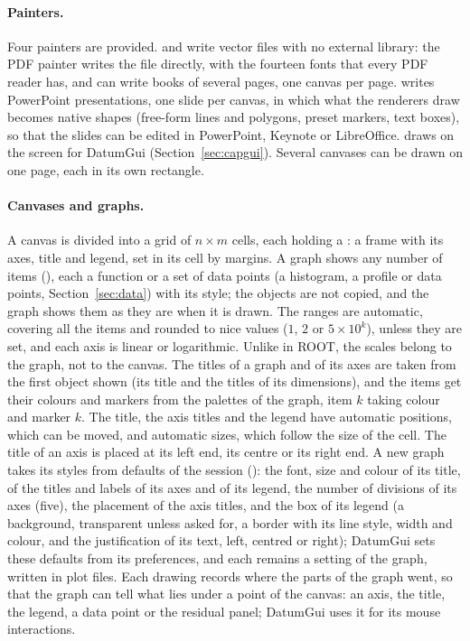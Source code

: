\paragraph{Painters.}
Four painters are provided.  and  write vector files with no external library: the
PDF painter writes the file directly, with the fourteen fonts that every PDF reader has, and can write books of
several pages, one canvas per page.  writes PowerPoint presentations, one slide per canvas, in which
what the renderers draw becomes native shapes (free-form lines and polygons, preset markers, text boxes), so that the
slides can be edited in PowerPoint, Keynote or LibreOffice.  draws on the screen for DatumGui
(Section~\ref{sec:capgui}). Several canvases can be drawn on one page, each in its own rectangle.

\paragraph{Canvases and graphs.}
A canvas is divided into a grid of $n \times m$ cells, each holding a : a frame with its axes, title and
legend, set in its cell by margins. A graph shows any number of items (), each a function or a set of
data points (a histogram, a profile or data points, Section~\ref{sec:data}) with its style; the objects are not
copied, and the graph shows them as they are when it is drawn. The ranges are automatic, covering all the items and
rounded to nice values ($1$, $2$ or $5\times 10^k$), unless they are set, and each axis is linear or logarithmic.
Unlike in ROOT, the scales belong to the graph, not to the canvas. The titles of a graph and of its axes are taken from the first object shown (its title
and the titles of its dimensions), and the items get their colours and markers from the palettes of the graph, item
$k$ taking colour and marker $k$. The title, the axis titles and the legend have automatic positions, which can be
moved, and automatic sizes, which follow the size of the cell. The title of an axis is placed at its left end,
its centre or its right end. A new graph takes its styles from defaults of the session (): the
font, size and colour of its title, of the titles and labels of its axes and of its legend, the number of divisions
of its axes (five), the placement of the axis titles, and the box of its legend (a background, transparent unless
asked for, a border with its line style, width and colour, and the justification of its text, left, centred or
right); DatumGui sets these defaults from its preferences, and each remains a setting of the graph, written in plot
files. Each drawing records where the parts of the graph
went, so that the graph can tell what lies under a point of the canvas: an axis, the title, the legend, a data point
or the residual panel; DatumGui uses it for its mouse interactions.

